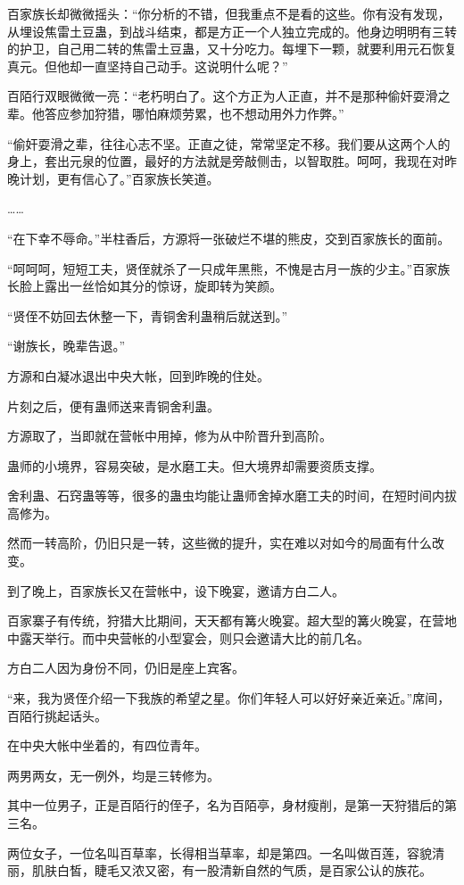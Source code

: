 \begin{this_body}
百家族长却微微摇头：“你分析的不错，但我重点不是看的这些。你有没有发现，从埋设焦雷土豆蛊，到战斗结束，都是方正一个人独立完成的。他身边明明有三转的护卫，自己用二转的焦雷土豆蛊，又十分吃力。每埋下一颗，就要利用元石恢复真元。但他却一直坚持自己动手。这说明什么呢？”

百陌行双眼微微一亮：“老朽明白了。这个方正为人正直，并不是那种偷奸耍滑之辈。他答应参加狩猎，哪怕麻烦劳累，也不想动用外力作弊。”

“偷奸耍滑之辈，往往心志不坚。正直之徒，常常坚定不移。我们要从这两个人的身上，套出元泉的位置，最好的方法就是旁敲侧击，以智取胜。呵呵，我现在对昨晚计划，更有信心了。”百家族长笑道。

……

“在下幸不辱命。”半柱香后，方源将一张破烂不堪的熊皮，交到百家族长的面前。

“呵呵呵，短短工夫，贤侄就杀了一只成年黑熊，不愧是古月一族的少主。”百家族长脸上露出一丝恰如其分的惊讶，旋即转为笑颜。

“贤侄不妨回去休整一下，青铜舍利蛊稍后就送到。”

“谢族长，晚辈告退。”

方源和白凝冰退出中央大帐，回到昨晚的住处。

片刻之后，便有蛊师送来青铜舍利蛊。

方源取了，当即就在营帐中用掉，修为从中阶晋升到高阶。

蛊师的小境界，容易突破，是水磨工夫。但大境界却需要资质支撑。

舍利蛊、石窍蛊等等，很多的蛊虫均能让蛊师舍掉水磨工夫的时间，在短时间内拔高修为。

然而一转高阶，仍旧只是一转，这些微的提升，实在难以对如今的局面有什么改变。

到了晚上，百家族长又在营帐中，设下晚宴，邀请方白二人。

百家寨子有传统，狩猎大比期间，天天都有篝火晚宴。超大型的篝火晚宴，在营地中露天举行。而中央营帐的小型宴会，则只会邀请大比的前几名。

方白二人因为身份不同，仍旧是座上宾客。

“来，我为贤侄介绍一下我族的希望之星。你们年轻人可以好好亲近亲近。”席间，百陌行挑起话头。

在中央大帐中坐着的，有四位青年。

两男两女，无一例外，均是三转修为。

其中一位男子，正是百陌行的侄子，名为百陌亭，身材瘦削，是第一天狩猎后的第三名。

两位女子，一位名叫百草率，长得相当草率，却是第四。一名叫做百莲，容貌清丽，肌肤白皙，睫毛又浓又密，有一股清新自然的气质，是百家公认的族花。


\end{this_body}
